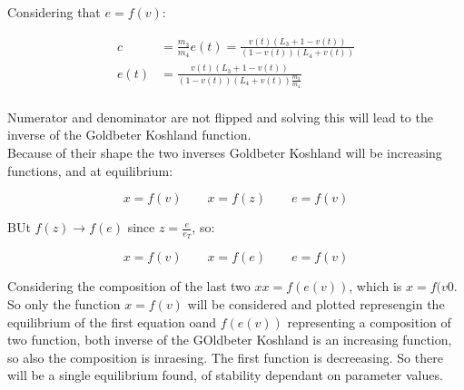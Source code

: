     Considering that $e = f(v)$:

    \begin{align*}
      c &= \frac{m_3}{m_4}e(t) = \frac{v(t)(L_3+1-v(t))}{(1-v(t))(L_4+v(t))}\\
      e(t) &= \frac{v(t)(L_3+1-v(t))}{(1-v(t))(L_4+v(t))\frac{m_3}{m_4}}\\
    \end{align*}

    Numerator and denominator are not flipped and solving this will lead to the inverse of the Goldbeter Koshland function.\\
    Because of their shape the two inverses Goldbeter Koshland will be increasing functions, and at equilibrium:

    $$x = f(v)\qquad x = f(z)\qquad e = f(v)$$

    BUt $f(z)\to f(e)$ since $z = \frac{e}{e_T}$, so:

    $$x = f(v)\qquad x = f(e)\qquad e = f(v)$$

    Considering the composition of the last two $xx = f(e(v))$, which is $x= f(v0$.
    So only the function $x = f(v)$ will be considered and plotted represengin the equilibrium of the first equation oand $f(e(v))$ representing a composition of two function, both inverse of the GOldbeter Koshland is an increasing function, so also the composition is inraesing.
    The first function is decreeasing.
    So there will be a single equilibrium found, of stability dependant on parameter values.

















